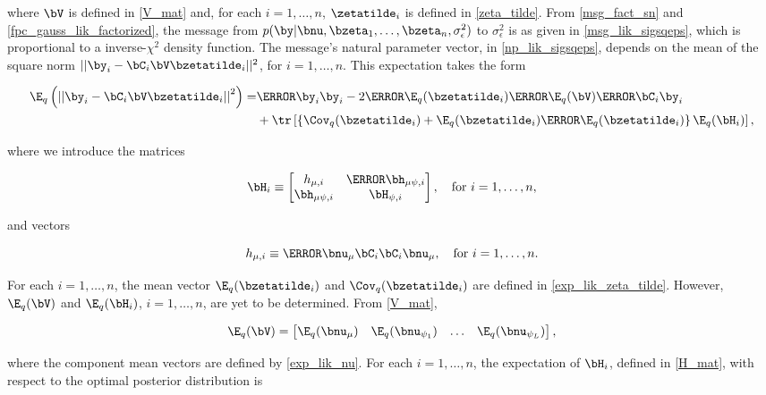 \documentclass[12pt]{article}
\def\sigsqeps{\sigma^2_{\epsilon}}
\def\numu{\bnu_\mu}
\newcommand\nupsi[1]{\bnu_{\psi_{#1}}}
\newcommand\hmu[1]{h_{\mu, i}}
\newcommand\hmupsi[1]{\bh_{\mu \psi, i}}
\newcommand\Hpsi[1]{\bH_{\psi, i}}
\theoremstyle{plain}
\theoremstyle{definition}
\theoremstyle{remark}
\begin{document}
\noindent where $\bV$ is defined in \eqref{V_mat} and, for each $i = 1, \dots, n$, $\zetatilde_i$ is defined in
\eqref{zeta_tilde}.
From \eqref{msg_fact_sn} and \eqref{fpc_gauss_lik_factorized}, the message from $p (\by | \bnu,
\bzeta_1, \dots, \bzeta_n, \sigsqeps)$ to $\sigsqeps$ is as given in \eqref{msg_lik_sigsqeps}, which is proportional
to a inverse-$\chi^2$ density function. The message's natural parameter vector, in \eqref{np_lik_sigsqeps}, depends
on the mean of the square norm $|| \by_i - \bC_i \bV \bzetatilde_i ||^2$, for $i = 1, \dots, n$.
This expectation takes the form

\begin{align*}
	\E_q \left(
		\left|\left| \by_i - \bC_i \bV \bzetatilde_i \right|\right|^2
	\right) =
		& \T{\by_i} \by_i - 2 \T{\E_q (\bzetatilde_i)} \T{\E_q (\bV)} \T{\bC_i} \by_i \\
		& + \tr \left[
			\left\{ \Cov_q (\bzetatilde_i) + \E_q (\bzetatilde_i) \T{\E_q (\bzetatilde_i)} \right\} \E_q (\bH_i)
		\right],
\end{align*}

\noindent where we introduce the matrices

\begin{equation}
	\bH_i \equiv \begin{bmatrix}
		\hmu{i} & \T{\hmupsi{i}} \\
		\hmupsi{i} & \Hpsi{i}
	\end{bmatrix}, \quad
	\text{for $i = 1, \dots, n$},
\label{H_mat}
\end{equation}

\noindent and vectors

\begin{equation}
	\hmu{i} \equiv \T{\numu} \bC_i \bC_i \numu, \quad
	\text{for $i = 1, \dots, n$}.
\label{hmu_vec}
\end{equation}

\noindent For each $i = 1, \dots, n$, the mean vector $\E_q (\bzetatilde_i)$ and $\Cov_q (\bzetatilde_i)$ are defined in
\eqref{exp_lik_zeta_tilde}. However, $\E_q (\bV)$ and $\E_q (\bH_i)$, $i = 1, \dots, n$, are yet to be determined.
From \eqref{V_mat},

\[
	\E_q (\bV) = \begin{bmatrix}
		\E_q (\numu) & \E_q (\nupsi{1}) & \dots & \E_q (\nupsi{L})
	\end{bmatrix},
\]

\noindent where the component mean vectors are defined by \eqref{exp_lik_nu}.
For each $i = 1, \dots, n$, the expectation of $\bH_i$, defined in \eqref{H_mat},
with respect to the optimal posterior distribution is
\end{document}
